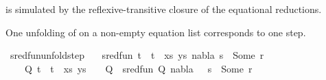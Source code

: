 %
\begin{isabellebody}%
%
%
\isadelimtheory
%
\endisadelimtheory
%
\isatagtheory
%
\endisatagtheory
{\isafoldtheory}%
%
\isadelimtheory
%
\endisadelimtheory
%
\isadelimdocument
%
\endisadelimdocument
%
\isatagdocument
%
\isamarkuptrue%
%
\endisatagdocument
{\isafolddocument}%
%
\isadelimdocument
%
\endisadelimdocument
%
\begin{isamarkuptext}%
 is simulated by the reflexive-transitive closure of the equational reductions.%
\end{isamarkuptext}\isamarkuptrue%
%
\begin{isamarkuptext}%
One unfolding of  on a non-empty equation list corresponds to one  step.%
\end{isamarkuptext}\isamarkuptrue%
\isamarkupfalse%
\ sred{\isacharunderscore}{\kern0pt}fun{\isacharunderscore}{\kern0pt}unfold{\isacharunderscore}{\kern0pt}step{\isacharcolon}{\kern0pt}\isanewline
\ \ \ {\isachardoublequoteopen}sred{\isacharunderscore}{\kern0pt}fun\ {\isacharparenleft}{\kern0pt}{\isacharparenleft}{\kern0pt}{\isacharparenleft}{\kern0pt}t{}\ {\isasymapprox}{\isacharquery}{\kern0pt}\ t{}{\isacharparenright}{\kern0pt}\ {\isacharhash}{\kern0pt}\ xs{\isacharcomma}{\kern0pt}\ ys{\isacharparenright}{\kern0pt}{\isacharcomma}{\kern0pt}\ nabla{\isacharcomma}{\kern0pt}\ s{\isacharparenright}{\kern0pt}\ {\isacharequal}{\kern0pt}\ Some\ r{\isachardoublequoteclose}\isanewline
\ \ \ {\isachardoublequoteopen}{\isasymexists}{\isasymsigma}\ Q{\isachardot}{\kern0pt}\ {\isacharparenleft}{\kern0pt}{\isacharparenleft}{\kern0pt}t{}\ {\isasymapprox}{\isacharquery}{\kern0pt}\ t{}{\isacharparenright}{\kern0pt}\ {\isacharhash}{\kern0pt}\ xs{\isacharcomma}{\kern0pt}\ ys{\isacharparenright}{\kern0pt}\ {\isasymturnstile}\ {\isasymsigma}\ {\isasymleadsto}\ Q\ {\isasymand}\ sred{\isacharunderscore}{\kern0pt}fun\ {\isacharparenleft}{\kern0pt}Q{\isacharcomma}{\kern0pt}\ nabla{\isacharcomma}{\kern0pt}\ {\isasymsigma}\ {\isasymbullet}\ s{\isacharparenright}{\kern0pt}\ {\isacharequal}{\kern0pt}\ Some\ r{\isachardoublequoteclose}\isanewline
%
\isadelimproof
%
\endisadelimproof
%
\isatagproof
{}\isamarkupfalse%
\ {\isacharminus}{\kern0pt}\isanewline

\end{isabellebody}
